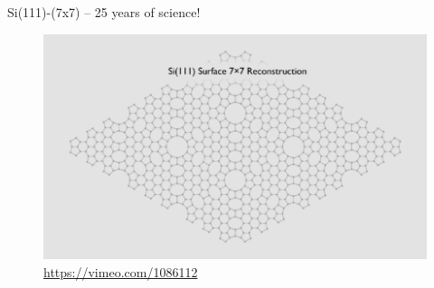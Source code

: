 \documentclass[aspectratio=169]{beamer}
\begin{document}
\begin{frame}{Si(111)-(7x7) – 25 years of science!}
\begin{figure}
    \centering
    \includegraphics[width=0.7\linewidth]{lectures/figures/11_Si111.png}
    \caption{\url{https://vimeo.com/1086112}}
\end{figure} 
\end{frame} 
\end{document}
